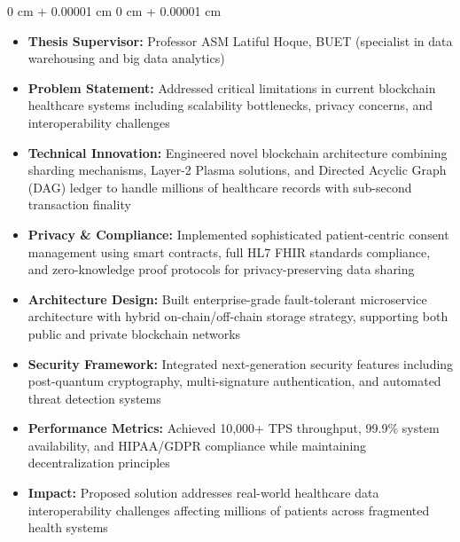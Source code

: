 \documentclass[10pt, letterpaper]{article}
\newenvironment{highlights}{
    \begin{itemize}[
        topsep=0.10 cm,
        parsep=0.10 cm,
        partopsep=0pt,
        itemsep=0pt,
        leftmargin=0 cm + 10pt
    ]
}{
    \end{itemize}
} %
\newenvironment{onecolentry}{
    \begin{adjustwidth}{
        0 cm + 0.00001 cm
    }{
        0 cm + 0.00001 cm
    }
}{
    \end{adjustwidth}
} %
\begin{document}
\begin{onecolentry}
    \begin{highlights}
        \item \textbf{Thesis Supervisor:} Professor ASM Latiful Hoque, BUET (specialist in data warehousing and big data analytics)
        \item \textbf{Problem Statement:} Addressed critical limitations in current blockchain healthcare systems including scalability bottlenecks, privacy concerns, and interoperability challenges
        \item \textbf{Technical Innovation:} Engineered novel blockchain architecture combining sharding mechanisms, Layer-2 Plasma solutions, and Directed Acyclic Graph (DAG) ledger to handle millions of healthcare records with sub-second transaction finality
        \item \textbf{Privacy \& Compliance:} Implemented sophisticated patient-centric consent management using smart contracts, full HL7 FHIR standards compliance, and zero-knowledge proof protocols for privacy-preserving data sharing
        \item \textbf{Architecture Design:} Built enterprise-grade fault-tolerant microservice architecture with hybrid on-chain/off-chain storage strategy, supporting both public and private blockchain networks
        \item \textbf{Security Framework:} Integrated next-generation security features including post-quantum cryptography, multi-signature authentication, and automated threat detection systems
        \item \textbf{Performance Metrics:} Achieved 10,000+ TPS throughput, 99.9\% system availability, and HIPAA/GDPR compliance while maintaining decentralization principles
        \item \textbf{Impact:} Proposed solution addresses real-world healthcare data interoperability challenges affecting millions of patients across fragmented health systems
    \end{highlights}
\end{onecolentry}
\end{document}
